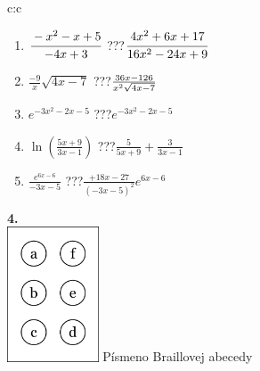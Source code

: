 \documentclass[10pt]{report}
\begin{document}
\begin{tabular}{c:c}
\begin{minipage}[c][104.5mm][t]{0.5\linewidth}
\begin{center}
\begin{minipage}{0.79\linewidth}
\begin{center}
\begin{varwidth}{\linewidth}
\begin{enumerate}
\item $\cfrac{-x^2-x+5}{-4x+3}$\quad \dotfill\; ???\;\dotfill \quad $\cfrac{4x^2+6x+17}{16x^2-24x+9}$
\item $\frac{-9}{x}\sqrt{4x-7}$\quad \dotfill\; ???\;\dotfill \quad $\frac{36x-126}{x^2 \sqrt{\smash[b]{4x-7}}}$
\item $e^{-3x^2-2x-5}$\quad \dotfill\; ???\;\dotfill \quad $e^{-3x^2-2x-5}$
\item $\ln{\left(\frac{5x+9}{3x-1}\right)}$\quad \dotfill\; ???\;\dotfill \quad $\frac{5}{5x+9}+\frac{3}{3x-1}$
\item $\frac{e^{6x-6}}{-3x-5}$\quad \dotfill\; ???\;\dotfill \quad $\frac{+18x-27}{(-3x-5)^2}e^{6x-6}$
\end{enumerate}
\end{varwidth}
\end{center}
\end{minipage}
\begin{minipage}{0.20\linewidth}
\begin{center}
{\Huge\bfseries 4.} \\[2mm]
\includegraphics[height=40mm]{../images/braille.png}
{\small Písmeno Braillovej abecedy}
\end{center}
\end{minipage}
\end{center}
\end{minipage}
%
\end{tabular}
\newpage
\thispagestyle{empty}
\end{document}
